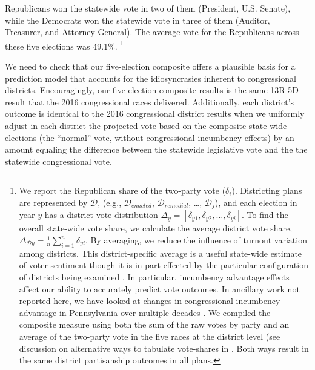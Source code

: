 %    
    Republicans won the statewide vote in two of them (President, U.S. Senate), while the Democrats won the statewide vote in three of them (Auditor, Treasurer, and Attorney General). The average vote for the Republicans across these five elections was 49.1\%.
    \footnote{We report the Republican share of the two-party vote ($\delta_{i}$). Districting plans are represented by $\mathcal D $, (e.g., $\mathcal D_{enacted}$, $\mathcal D_{remedial}$, \dots, $\mathcal D_{j}$), and each election in year $ y $ has a district vote distribution $ \Delta_{y} = [\delta_{y1}, \delta_{y2}, \dots, \delta_{yi}] $. To find the overall state-wide vote share, we calculate the average district vote share, $ \bar{\Delta}_{\mathcal D y} = \frac{1}{n}\sum\limits_{i=1}^{n} \delta_{yi} $. By averaging, we reduce the influence of turnout variation among districts. This district-specific average is a useful state-wide estimate of voter sentiment though it is in part effected by the particular configuration of districts being examined \citep[see e.g.][cf. \cite{Grofman_et_al_1997__IntedgratedPerspective_ES}]{Kastellec_et_al_2008_PS}. In particular, incumbency advantage effects affect our ability to accurately predict vote outcomes. In ancillary work not reported here, we have looked at changes in congressional incumbency advantage in Pennsylvania over multiple decades \citep[cf.][]{Jacobson2015}. We compiled the composite measure using both the sum of the raw votes by party and an average of the two-party vote in the five races at the district level (see discussion on alternative ways to tabulate vote-shares in \citet{Grofman_et_al_1997__IntedgratedPerspective_ES}. Both ways result in the same district partisanship outcomes in all plans.}
\par
    We need to check that our five-election composite offers a plausible basis for a prediction model that accounts for the idiosyncrasies inherent to congressional districts. Encouragingly, our five-election composite results is the same 13R-5D result that the 2016 congressional races delivered. Additionally, each district’s outcome is identical to the 2016 congressional district results when we uniformly adjust in each district the projected vote based on the composite state-wide elections (the ``normal'' vote, without  congressional incumbency effects) by an amount equaling the difference between the statewide legislative vote and the the statewide congressional vote.
